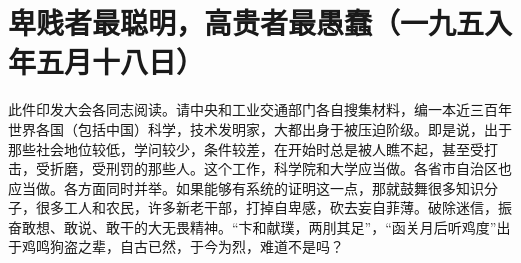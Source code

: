 \section[卑贱者最聪明，高贵者最愚蠢（一九五入年五月十八日）]{卑贱者最聪明，高贵者最愚蠢（一九五入年五月十八日）}


此件印发大会各同志阅读。请中央和工业交通部门各自搜集材料，编一本近三百年世界各国（包括中国）科学，技术发明家，大都出身于被压迫阶级。即是说，出于那些社会地位较低，学问较少，条件较差，在开始时总是被人瞧不起，甚至受打击，受折磨，受刑罚的那些人。这个工作，科学院和大学应当做。各省市自治区也应当做。各方面同时并举。如果能够有系统的证明这一点，那就鼓舞很多知识分子，很多工人和农民，许多新老干部，打掉自卑感，砍去妄自菲薄。破除迷信，振奋敢想、敢说、敢干的大无畏精神。“卞和献璞，两刖其足”，“函关月后听鸡度”出于鸡鸣狗盗之辈，自古已然，于今为烈，难道不是吗？


